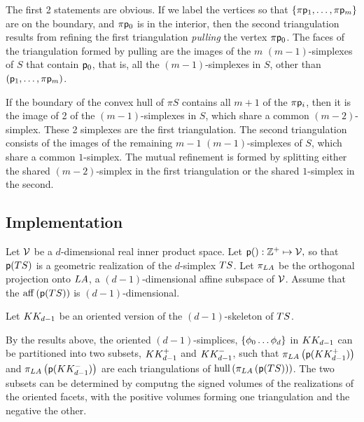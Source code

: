 The first 2 statements are obvious.
If we label the vertices so that $\{\pi \mathsf{p}_1, \ldots , \pi \mathsf{p}_m\}$
are on the boundary, and $\pi \mathsf{p}_0$ is in the interior,
then the second triangulation results from refining the first
triangulation {\it pulling}
\cite{lee-hdcg-17-2004} the vertex $\pi \mathsf{p}_0$.
The faces of the triangulation formed by pulling
are the images of the $m$ $(m-1)$-simplexes
of $S$ that contain $\mathsf{p}_0$, that is, all the $(m-1)$-simplexes in $S$,
other than $(\mathsf{p}_1, \ldots , \pi \mathsf{p}_m)$.

\begin{Theorem}
\label{two-simplex-case}
If the boundary of the convex hull of $\pi S$
contains all $m+1$ of the $\pi \mathsf{p}_i$,
then it is the image of 2 of the $(m-1)$-simplexes in $S$,
which share a common $(m-2)$-simplex.
These 2 simplexes are the first triangulation.
The second triangulation consists of the images
of the remaining $m-1$ $(m-1)$-simplexes of $S$,
which share a common $1$-simplex.
The mutual refinement is formed by splitting either
the shared $(m-2)$-simplex in the first triangulation
or the shared $1$-simplex in the second.
\end{Theorem}

\subsection{Implementation}

Let $\mathcal{V}$ be a $d$-dimensional real inner product space.
Let $\mathsf{p}() : \mathbb{Z}^{+} \mapsto \mathcal{V},$
so that $\mathsf{p}(T{S})$ is a geometric realization of the $d$-simplex $T{S}$.
Let $\pi_{L{A}}$ be the orthogonal projection onto
$L{A}$, a $(d-1)$-dimensional affine subspace of $\mathcal{V}$.
Assume that the $\mathrm{aff} \left( \mathsf{p}(T{S}) \right)$
is $(d-1)$-dimensional.

Let $K{K}_{d-1}$ be an oriented version of the $(d-1)$-skeleton of $T{S}$.

By the results above, the oriented $(d-1)$-simplices,
$\{ \phi_0 \ldots \phi_d \}$ in $K{K}_{d-1}$
can be partitioned into two subsets, $K{K}_{d-1}^{+}$
and $K{K}_{d-1}^{-}$, such that
$\pi_{L{A}} \left( \mathsf{p} ( K{K}_{d-1}^{+} ) \right)$
and
$\pi_{L{A}} \left( \mathsf{p} ( K{K}_{d-1}^{-} ) \right)$
are each triangulations of
$\mathrm{hull} \left( \pi_{L{A}} \left( \mathsf{p} ( T{S} ) \right) \right)$.
The two subsets can be determined by computng the signed
volumes of the realizations of the oriented facets,
with the positive volumes forming one triangulation and the negative the other.

